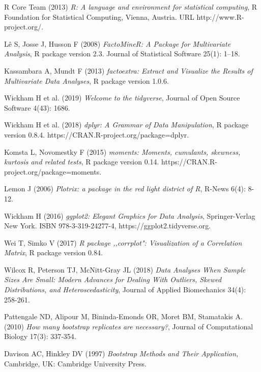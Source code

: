 \documentclass[12pt,a4paper,notitlepage]{report}
\begin{document}
\begin{thebibliography}{26}
 R Core Team (2013) \emph{R: A language and environment for statistical computing}, R Foundation for Statistical Computing, Vienna, Austria. URL http://www.R-project.org/.

 L\^e S, Josse J, Husson F (2008) \emph{FactoMineR: A Package for Multivariate Analysis}, R package version 2.3. Journal of Statistical Software 25(1): 1–18.

 Kassambara A, Mundt F (2013) \emph{factoextra: Extract and Visualize the Results of Multivariate Data Analyses}, R package version 1.0.6.

 Wickham H et al. (2019) \emph{Welcome to the tidyverse}, Journal of Open Source Software 4(43): 1686.

 Wickham H et al. (2018) \emph{dplyr: A Grammar of Data Manipulation}, R package version 0.8.4. https://CRAN.R-project.org/package=dplyr.

 Komsta L, Novomestky F (2015) \emph{moments: Moments, cumulants, skewness, kurtosis and related tests},  R package version 0.14. https://CRAN.R-project.org/package=moments.

 Lemon J (2006) \emph{Plotrix: a package in the red light district of R}, R-News 6(4): 8-12. 

 Wickham H (2016) \emph{ggplot2: Elegant Graphics for Data Analysis}, Springer-Verlag New York. ISBN 978-3-319-24277-4, https://ggplot2.tidyverse.org. 

 Wei T, Simko V (2017) \emph{R package ,,corrplot": Visualization of a Correlation Matrix}, R package version 0.84.

 Wilcox R, Peterson TJ, McNitt-Gray JL (2018) \emph{Data Analyses When Sample Sizes Are Small: Modern Advances for Dealing With Outliers, Skewed Distributions, and Heteroscedasticity}, Journal of Applied Biomechanics 34(4): 258-261.

 Pattengale ND, Alipour M, Bininda-Emonds OR, Moret BM, Stamatakis A. (2010) \emph{How many bootstrap replicates are necessary?}, Journal of Computational Biology 17(3): 337‐354.

 Davison AC, Hinkley DV (1997) \emph{Bootstrap Methods and Their Application}, Cambridge, UK: Cambridge University Press.




\end{thebibliography}
\end{document}

